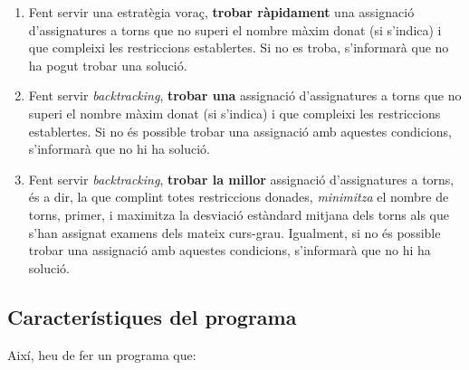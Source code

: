 \documentclass[10pt,a4paper]{../documents/class_material_assignatura_udg}
\begin{document}
\begin{enumerate}
    \item Fent servir una estratègia voraç, \textbf{trobar ràpidament} una assignació d'assignatures a torns que no superi el nombre màxim donat (si s'indica) i que compleixi les restriccions establertes. Si no es troba, s'informarà que no ha pogut trobar una solució.

    \item Fent servir \textit{backtracking}, \textbf{trobar una} assignació d'assignatures a torns que no superi el nombre màxim donat (si s'indica) i que compleixi les restriccions establertes. Si no és possible trobar una assignació amb aquestes condicions, s'informarà que no hi ha solució.
    
    \item Fent servir \textit{backtracking}, \textbf{trobar la millor} assignació d'assignatures a torns, és a dir, la que complint totes restriccions donades, \textit{minimitza} el nombre de torns, primer, i maximitza la desviació estàndard mitjana dels torns als que s'han assignat examens dels mateix curs-grau. Igualment, si no és possible trobar una assignació amb aquestes condicions, s'informarà que no hi ha solució.
\end{enumerate}

\subsection{Característiques del programa}\label{sec:caracteristiques}

Així, heu de fer un programa que:
\end{document}

